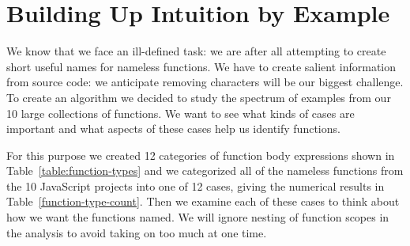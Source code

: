 \documentclass[10pt, preprint]{sigplanconf}
\begin{document}
\section{Building Up Intuition by Example}
\label{sec:intuition}
We know that we face an ill-defined task: we are after all attempting to create short useful names for nameless functions. We have to create salient information from source code: we anticipate removing characters will be our biggest challenge.  To create an algorithm we decided to study the spectrum of examples from our 10 large collections of functions. We want to see what kinds of cases are important and what aspects of these cases help us identify functions.

For this purpose we created 12 categories of function body expressions shown in Table~\ref{table:function-types} and we categorized all of the nameless functions from the 10 JavaScript projects into one of 12 cases, giving the numerical results in Table~\ref{function-type-count}.  Then we examine each of these cases to think about how we want the functions named. We will ignore nesting of function scopes in the analysis to avoid taking on too much at one time.
\end{document}
